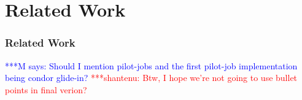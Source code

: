 \documentclass[times]{cpeauth}
\newcommand{\jhanote}[1]{ {\textcolor{red} { ***shantenu: #1 }}}
\newcommand{\mrnote}[1]{ {\textcolor{blue} { ***M says: #1 }}}
\newcommand{\pmnote}[1]{ {\textcolor{blue} { ***Pradeep: #1 }}}
\newcommand{\note}[1]{ {\textcolor{magenta} { ***Note: #1 }}}
\newcommand{\mrnote}[1]{}
\newcommand{\pmnote}[1]{}
\newcommand{\jhanote}[1]{}
\newcommand{\note}[1]{}
\begin{document}






\section{Related Work}


\subsubsection*{Related Work} 


\mrnote{Should I mention pilot-jobs and the first pilot-job implementation being condor glide-in?}
\jhanote{Btw, I hope we're not going to use bullet points in final verion?}

\end{document}
